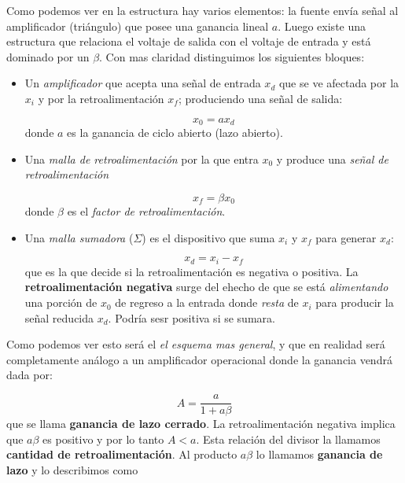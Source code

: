 \documentclass[12pt,a4paper]{article}
\numberwithin{equation}{section}
\numberwithin{figure}{section}
\begin{document}
Como podemos ver en la estructura hay varios elementos: la fuente envía señal al amplificador (triángulo) que posee una ganancia lineal $a$. Luego existe una estructura que relaciona el voltaje de salida con el voltaje de entrada y está dominado por un $\beta$. Con mas claridad distinguimos los siguientes bloques:



\begin{itemize}
\item Un \textit{amplificador} que acepta una señal de entrada $x_d$ que se ve afectada por la $x_i$ y por la retroalimentación $x_f$; produciendo una señal de salida:

\begin{equation}
x_0 = a x_d
\end{equation}
donde $a$ es la ganancia de ciclo abierto (lazo abierto).

\item Una \textit{malla de retroalimentación} por la que entra $x_0$ y produce una \textit{señal de retroalimentación}

\begin{equation}
x_f = \beta x_0
\end{equation}
donde $\beta$ es el \textit{factor de retroalimentación}.

\item Una \textit{malla sumadora} ($\Sigma$) es el dispositivo que suma $x_i$ y $x_f$ para generar $x_d$: 

\begin{equation}
x_d = x_i - x_f
\end{equation}
que es la que decide si la retroalimentación es negativa o positiva. La \textbf{retroalimentación negativa} surge del ehecho de que se está \textit{alimentando} una porción de $x_0$ de regreso a la entrada donde \textit{resta} de $x_i$ para producir la señal reducida $x_d$. Podría sesr positiva si se sumara.
\end{itemize}

Como podemos ver esto será el \textit{el esquema mas general}, y que en realidad será completamente análogo a un amplificador operacional donde la ganancia vendrá dada por:

\begin{equation}
A = \dfrac{a}{1+ a \beta}
\end{equation}
que se llama \textbf{ganancia de lazo cerrado}. La retroalimentación negativa implica que $a \beta$  es positivo y por lo tanto $A<a$. Esta relación del divisor la llamamos \textbf{cantidad de retroalimentación}. Al producto $a\beta$ lo llamamos \textbf{ganancia de lazo} y lo describimos como
\end{document}
